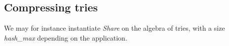 \subsection{Compressing tries}

We may for instance instantiate {\sl Share} on the algebra of tries, with
a size {\sl hash\_max} depending on the application.


